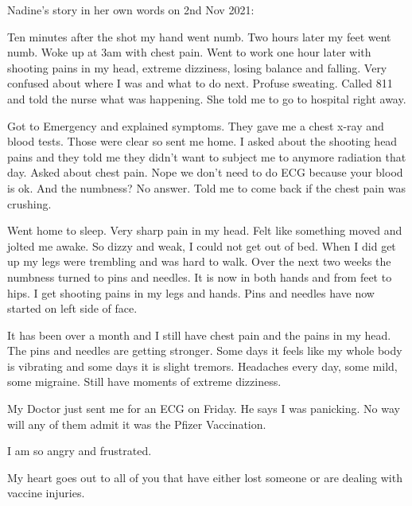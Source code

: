 Nadine’s story in her own words on 2nd Nov 2021:

Ten minutes after the shot my hand went numb. Two hours later my feet went
numb. Woke up at 3am with chest pain. Went to work one hour later with shooting
pains in my head, extreme dizziness, losing balance and falling. Very confused
about where I was and what to do next. Profuse sweating. Called 811 and told the
nurse what was happening. She told me to go to hospital right away.

Got to Emergency and explained symptoms. They gave me a chest x-ray and blood
tests. Those were clear so sent me home. I asked about the shooting head pains
and they told me they didn’t want to subject me to anymore radiation that
day. Asked about chest pain. Nope we don’t need to do ECG because your blood is
ok. And the numbness? No answer. Told me to come back if the chest pain was
crushing.

Went home to sleep. Very sharp pain in my head. Felt like something moved and
jolted me awake. So dizzy and weak, I could not get out of bed. When I did get
up my legs were trembling and was hard to walk. Over the next two weeks the
numbness turned to pins and needles. It is now in both hands and from feet to
hips. I get shooting pains in my legs and hands. Pins and needles have now
started on left side of face.

It has been over a month and I still have chest pain and the pains in my
head. The pins and needles are getting stronger. Some days it feels like my
whole body is vibrating and some days it is slight tremors. Headaches every day,
some mild, some migraine. Still have moments of extreme dizziness.

My Doctor just sent me for an ECG on Friday. He says I was panicking. No way
will any of them admit it was the Pfizer Vaccination.

I am so angry and frustrated.

My heart goes out to all of you that have either lost someone or are dealing
with vaccine injuries.
